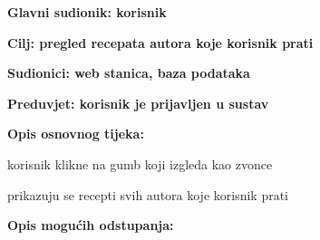					\noindent {}
					\begin{packed_item}
						\item \textbf{Glavni sudionik: korisnik}
						\item  \textbf{Cilj: pregled recepata autora koje korisnik prati}
						\item  \textbf{Sudionici: web stanica, baza podataka}
						\item  \textbf{Preduvjet: korisnik je prijavljen u sustav}
						
						\item  \textbf{Opis osnovnog tijeka:}
						\item[] \begin{packed_enum}
							\item korisnik klikne na gumb koji izgleda kao zvonce
							\item prikazuju se recepti svih autora koje korisnik prati
						\end{packed_enum}
						
						\item  \textbf{Opis mogućih odstupanja:}
						\item[] \begin{packed_item}							
						\end{packed_item}
					\end{packed_item}
				
				
				
